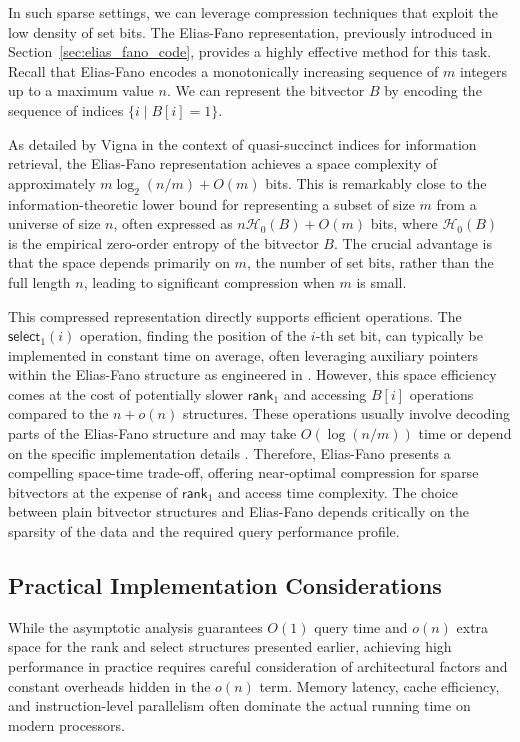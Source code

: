 In such sparse settings, we can leverage compression techniques that exploit the low density of set bits. The Elias-Fano representation, previously introduced in Section~\ref{sec:elias_fano_code}, provides a highly effective method for this task. Recall that Elias-Fano encodes a monotonically increasing sequence of $m$ integers up to a maximum value $n$. We can represent the bitvector $B$ by encoding the sequence of indices $\{ i \mid B[i]=1 \}$.

As detailed by Vigna \cite{vigna2013quasi} in the context of quasi-succinct indices for information retrieval, the Elias-Fano representation achieves a space complexity of approximately $m \log_2(n/m) + O(m)$ bits. This is remarkably close to the information-theoretic lower bound for representing a subset of size $m$ from a universe of size $n$, often expressed as $n\mathcal{H}_0(B) + O(m)$ bits, where $\mathcal{H}_0(B)$ is the empirical zero-order entropy of the bitvector $B$. The crucial advantage is that the space depends primarily on $m$, the number of set bits, rather than the full length $n$, leading to significant compression when $m$ is small.

This compressed representation directly supports efficient operations. The $\textsf{select}_1(i)$ operation, finding the position of the $i$-th set bit, can typically be implemented in constant time on average, often leveraging auxiliary pointers within the Elias-Fano structure as engineered in \cite{vigna2013quasi}. However, this space efficiency comes at the cost of potentially slower $\textsf{rank}_1$ and accessing $B[i]$ operations compared to the $n+o(n)$ structures. These operations usually involve decoding parts of the Elias-Fano structure and may take $O(\log(n/m))$ time or depend on the specific implementation details \cite{navarro2016compact}. Therefore, Elias-Fano presents a compelling space-time trade-off, offering near-optimal compression for sparse bitvectors at the expense of $\textsf{rank}_1$ and access time complexity. The choice between plain bitvector structures and Elias-Fano depends critically on the sparsity of the data and the required query performance profile.

\subsection{Practical Implementation Considerations} \label{subsec:practical_considerations}

While the asymptotic analysis guarantees $O(1)$ query time and $o(n)$ extra space for the \textsf{rank} and \textsf{select} structures presented earlier, achieving high performance in practice requires careful consideration of architectural factors and constant overheads hidden in the $o(n)$ term. Memory latency, cache efficiency, and instruction-level parallelism often dominate the actual running time on modern processors.


